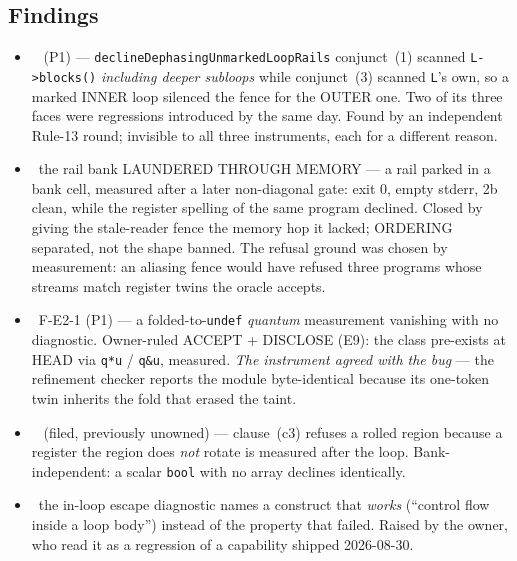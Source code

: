 \subsection*{Findings}
\begin{itemize}
  \item \fconfirmed\  (P1) --- \texttt{declineDephasingUnmarkedLoopRails}
        conjunct~(1) scanned \texttt{L->blocks()} \emph{including deeper subloops} while
        conjunct~(3) scanned \texttt{L}'s own, so a marked INNER loop silenced the fence
        for the OUTER one. Two of its three faces were regressions introduced by
         the same day. Found by an independent Rule-13 round; invisible to all
        three instruments, each for a different reason.
  \item \fconfirmed\ the rail bank LAUNDERED  THROUGH MEMORY --- a rail parked
        in a bank cell, measured after a later non-diagonal gate: exit 0, empty stderr,
        2b clean, while the register spelling of the same program declined. Closed by
        giving the stale-reader fence the memory hop it lacked; ORDERING separated, not
        the shape banned. The refusal ground was chosen by measurement: an aliasing fence
        would have refused three programs whose streams match register twins the oracle
        accepts.
  \item \fconfirmed\ F-E2-1 (P1) --- a folded-to-\texttt{undef} \emph{quantum}
        measurement vanishing with no diagnostic. Owner-ruled ACCEPT + DISCLOSE (E9): the
        class pre-exists at HEAD via \texttt{q*u} / \texttt{q\&u}, measured. \emph{The
        instrument agreed with the bug} --- the refinement checker reports the module
        byte-identical because its one-token twin inherits the fold that erased the taint.
  \item \foverdecline\  (filed, previously unowned) --- clause~(c3) refuses a
        rolled region because a register the region does \emph{not} rotate is measured
        after the loop. Bank-independent: a scalar \texttt{bool} with no array declines
        identically.
  \item \fdoc\ the in-loop escape diagnostic names a construct that \emph{works}
        (``control flow inside a loop body'') instead of the property that failed. Raised
        by the owner, who read it as a regression of a capability shipped 2026-08-30.
\end{itemize}

